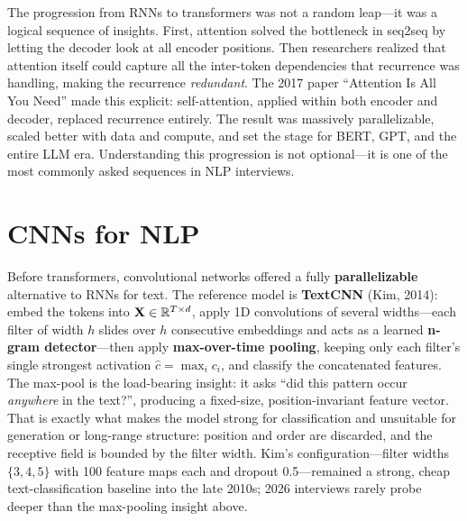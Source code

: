 \begin{keyinsight}
The progression from RNNs to transformers was not a random leap---it was a
logical sequence of insights.  First, attention solved the bottleneck in
seq2seq by letting the decoder look at all encoder positions.  Then
researchers realized that attention itself could capture all the
inter-token dependencies that recurrence was handling, making the
recurrence \emph{redundant}.  The 2017 paper ``Attention Is All You Need''
made this explicit: self-attention, applied within both encoder and
decoder, replaced recurrence entirely.  The result was massively
parallelizable, scaled better with data and compute, and set the stage for
BERT, GPT, and the entire LLM era.  Understanding this progression is not
optional---it is one of the most commonly asked sequences in NLP
interviews.
\end{keyinsight}


\section{CNNs for NLP}
\label{sec:cnn_nlp}

Before transformers, convolutional networks offered a fully
\textbf{parallelizable} alternative to RNNs for text.  The reference model
is \textbf{TextCNN} (Kim, 2014): embed the tokens into
$\mathbf{X} \in \mathbb{R}^{T \times d}$, apply 1D convolutions of several widths---each
filter of width $h$ slides over $h$ consecutive embeddings and acts as a
learned \textbf{n-gram detector}---then apply \textbf{max-over-time
pooling}, keeping only each filter's single strongest activation
$\hat{c} = \max_i c_i$, and classify the concatenated features.  The
max-pool is the load-bearing insight: it asks ``did this pattern occur
\emph{anywhere} in the text?'', producing a fixed-size, position-invariant
feature vector.  That is exactly what makes the model strong for
classification and unsuitable for generation or long-range structure:
position and order are discarded, and the receptive field is bounded by
the filter width.  Kim's configuration---filter widths $\{3,4,5\}$ with
100 feature maps each and dropout 0.5---remained a strong, cheap
text-classification baseline into the late 2010s; 2026 interviews rarely
probe deeper than the max-pooling insight above.


